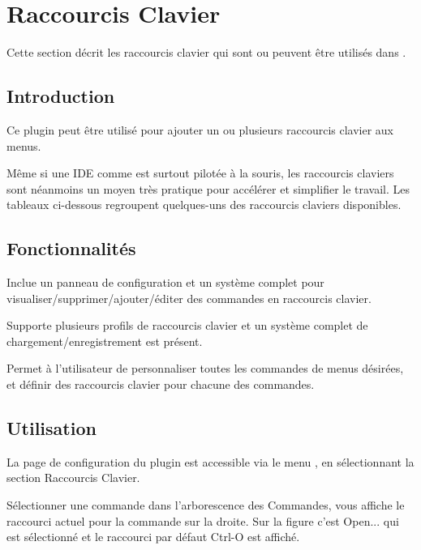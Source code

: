 \section{Raccourcis Clavier}

Cette section décrit les raccourcis clavier qui sont ou peuvent être utilisés dans \codeblocks.

\subsection{Introduction}

Ce plugin peut être utilisé pour ajouter un ou plusieurs raccourcis clavier aux menus.

Même si une IDE comme \codeblocks est surtout pilotée à la souris, les raccourcis claviers sont néanmoins un moyen très pratique pour accélérer et simplifier le travail. Les tableaux ci-dessous regroupent quelques-uns des raccourcis claviers disponibles.

\subsection{Fonctionnalités}
\begin{description}
\item Inclue un panneau de configuration et un système complet pour visualiser/supprimer/ajouter/éditer des commandes en raccourcis clavier.
\item Supporte plusieurs profils de raccourcis clavier et un système complet de chargement/enregistrement est présent.
\item Permet à l'utilisateur de personnaliser toutes les commandes de menus désirées, et définir des raccourcis clavier pour chacune des commandes.
\end{description}

\subsection{Utilisation}

La page de configuration du plugin est accessible via le menu , en sélectionnant la section Raccourcis Clavier.


Sélectionner une commande dans l'arborescence des Commandes, vous affiche le raccourci actuel pour la commande sur la droite. Sur la figure c'est Open... qui est sélectionné et le raccourci par défaut Ctrl-O est affiché.

